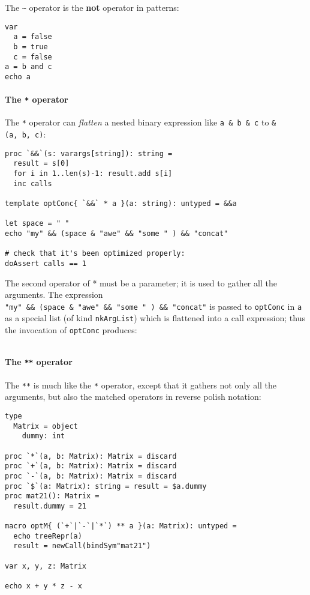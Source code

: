 The \texttt{\textasciitilde{}} operator is the \textbf{not} operator in
patterns:

\begin{verbatim}
var
  a = false
  b = true
  c = false
a = b and c
echo a
\end{verbatim}

\hypertarget{the-operator-3}{%
\paragraph{\texorpdfstring{The \texttt{*}
operator}{The * operator}}\label{the-operator-3}}

The \texttt{*} operator can \emph{flatten} a nested binary expression
like \texttt{a\ \&\ b\ \&\ c} to \texttt{\&(a,\ b,\ c)}:

\begin{verbatim}
proc `&&`(s: varargs[string]): string =
  result = s[0]
  for i in 1..len(s)-1: result.add s[i]
  inc calls

template optConc{ `&&` * a }(a: string): untyped = &&a

let space = " "
echo "my" && (space & "awe" && "some " ) && "concat"

# check that it's been optimized properly:
doAssert calls == 1
\end{verbatim}

The second operator of {*} must be a parameter; it is used to gather all
the arguments. The expression
\texttt{"my"\ \&\&\ (space\ \&\ "awe"\ \&\&\ "some\ "\ )\ \&\&\ "concat"}
is passed to \texttt{optConc} in \texttt{a} as a special list (of kind
\texttt{nkArgList}) which is flattened into a call expression; thus the
invocation of \texttt{optConc} produces:

\begin{verbatim}
\end{verbatim}

\hypertarget{the-operator-4}{%
\paragraph{\texorpdfstring{The \texttt{**}
operator}{The ** operator}}\label{the-operator-4}}

The \texttt{**} is much like the \texttt{*} operator, except that it
gathers not only all the arguments, but also the matched operators in
reverse polish notation:

\begin{verbatim}
type
  Matrix = object
    dummy: int

proc `*`(a, b: Matrix): Matrix = discard
proc `+`(a, b: Matrix): Matrix = discard
proc `-`(a, b: Matrix): Matrix = discard
proc `$`(a: Matrix): string = result = $a.dummy
proc mat21(): Matrix =
  result.dummy = 21

macro optM{ (`+`|`-`|`*`) ** a }(a: Matrix): untyped =
  echo treeRepr(a)
  result = newCall(bindSym"mat21")

var x, y, z: Matrix

echo x + y * z - x
\end{verbatim}

